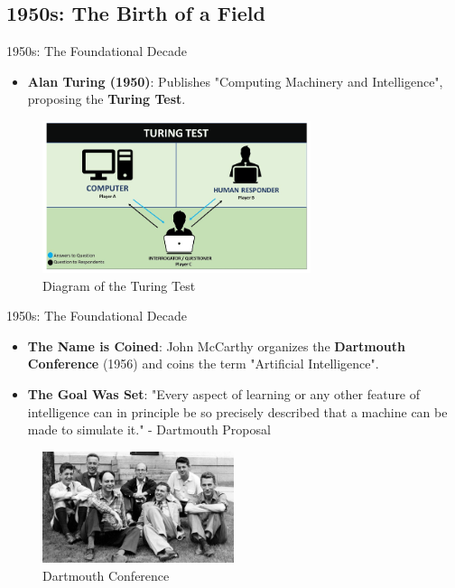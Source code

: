 \documentclass{beamer}
\begin{document}
\subsection{1950s: The Birth of a Field}

\begin{frame}[t]{1950s: The Foundational Decade}
    \begin{itemize}
        \item \textbf{Alan Turing (1950)}: Publishes "Computing Machinery and Intelligence", proposing the \textbf{Turing Test}.
    \end{itemize}
    \begin{figure}
        \includegraphics[width=0.7\textwidth]{images/turing-test.png}
        \caption{Diagram of the Turing Test}
    \end{figure}
\end{frame}

\begin{frame}[t]{1950s: The Foundational Decade}
    \begin{itemize}
        \item \textbf{The Name is Coined}: John McCarthy organizes the \textbf{Dartmouth Conference} (1956) and coins the term "Artificial Intelligence".
    \item \textbf{The Goal Was Set}: "Every aspect of learning or any other feature of intelligence can in principle be so precisely described that a machine can be made to simulate it." - Dartmouth Proposal
    \end{itemize}
    \begin{figure}
        \includegraphics[width=0.5\textwidth]{images/Dartmouth-1956-Conference.jpg}
        \caption{Dartmouth Conference}
    \end{figure}

\end{frame}
\end{document}
